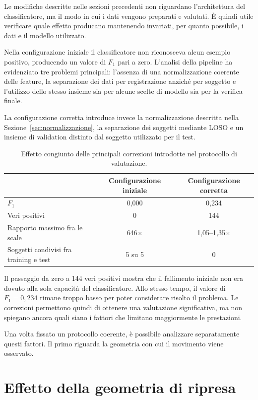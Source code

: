 Le modifiche descritte nelle sezioni precedenti non riguardano l'architettura del classificatore, ma il modo in cui i dati vengono preparati e valutati. È quindi utile verificare quale effetto producano mantenendo invariati, per quanto possibile, i dati e il modello utilizzato.

Nella configurazione iniziale il classificatore non riconosceva alcun esempio positivo, producendo un valore di $F_1$ pari a zero. L'analisi della pipeline ha evidenziato tre problemi principali: l'assenza di una normalizzazione coerente delle feature, la separazione dei dati per registrazione anziché per soggetto e l'utilizzo dello stesso insieme sia per alcune scelte di modello sia per la verifica finale.

La configurazione corretta introduce invece la normalizzazione descritta nella Sezione~\ref{sec:normalizzazione}, la separazione dei soggetti mediante LOSO e un insieme di validation distinto dal soggetto utilizzato per il test.

\begin{table}[ht]
\centering
\caption{Effetto congiunto delle principali correzioni introdotte nel
protocollo di valutazione.}
\label{tab:correzioni}
\begin{tabular}{lcc}
\toprule
 & \textbf{Configurazione iniziale} &
   \textbf{Configurazione corretta} \\
\midrule
$F_1$ & 0,000 & 0,234 \\
Veri positivi & 0 & 144 \\
Rapporto massimo fra le scale & 646$\times$ & 1,05--1,35$\times$ \\
Soggetti condivisi fra training e test & 5 su 5 & 0 \\
\bottomrule
\end{tabular}
\end{table}

Il passaggio da zero a 144 veri positivi mostra che il fallimento iniziale non era dovuto alla sola capacità del classificatore. Allo stesso tempo, il valore di $F_1=0{,}234$ rimane troppo basso per poter considerare risolto il problema. Le correzioni permettono quindi di ottenere una valutazione significativa, ma non spiegano ancora quali siano i fattori che limitano maggiormente le prestazioni.

Una volta fissato un protocollo coerente, è possibile analizzare separatamente questi fattori. Il primo riguarda la geometria con cui il movimento viene osservato.

\section{Effetto della geometria di ripresa}
\label{sec:viewpoint}

